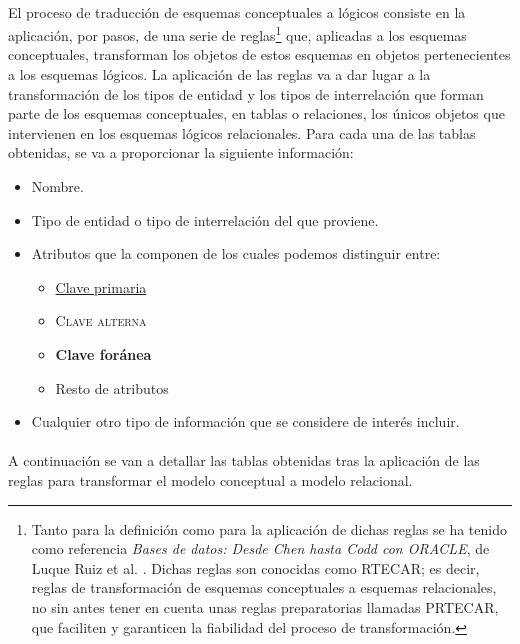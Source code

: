    \paragraph{}El proceso de traducción de esquemas conceptuales a lógicos
   consiste en la aplicación, por pasos, de una serie de reglas\footnote{Tanto
   para la definición como para la aplicación de dichas reglas se ha tenido
   como referencia \textit{Bases de datos: Desde Chen hasta Codd con ORACLE}, de
   Luque Ruiz et al. \cite{luqueRuiz}. Dichas reglas son conocidas como RTECAR;
   es decir, reglas
   de transformación de esquemas conceptuales a esquemas relacionales, no sin
   antes tener en cuenta unas reglas preparatorias llamadas PRTECAR, que
   faciliten y garanticen la fiabilidad del proceso de transformación.} que,
   aplicadas a los esquemas conceptuales, transforman los
   objetos de estos esquemas en objetos pertenecientes a los esquemas lógicos.
   La aplicación de las reglas va a dar lugar a la transformación de los tipos
   de entidad y los tipos de interrelación que forman parte de los esquemas
   conceptuales, en tablas o relaciones, los únicos objetos que intervienen en
   los esquemas lógicos relacionales. Para cada una de las tablas obtenidas, se
   va a proporcionar la siguiente información:

   \begin{itemize}
    \item Nombre.
    \item Tipo de entidad o tipo de interrelación del que proviene.
    \item Atributos que la componen de los cuales podemos distinguir entre:
    \begin{itemize}
     \item \underline{Clave primaria}
     \item \textsc{Clave alterna}
     \item \textbf{Clave foránea}
     \item Resto de atributos
    \end{itemize}
    \item Cualquier otro tipo de información que se considere de interés
          incluir.
   \end{itemize}

  \paragraph{}A continuación se van a detallar las tablas obtenidas tras la
  aplicación de las reglas para transformar el modelo conceptual a modelo
  relacional.
